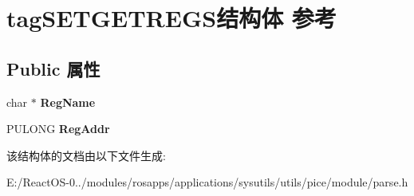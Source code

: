 \hypertarget{structtag_s_e_t_g_e_t_r_e_g_s}{}\section{tag\+S\+E\+T\+G\+E\+T\+R\+E\+G\+S结构体 参考}
\label{structtag_s_e_t_g_e_t_r_e_g_s}
\subsection*{Public 属性}
\begin{DoxyCompactItemize}
\item 
\mbox{\label{structtag_s_e_t_g_e_t_r_e_g_s_a567a9d8d11ca959fbaed0e6d025e4562}} 
char $\ast$ {\bfseries Reg\+Name}
\item 
\mbox{\label{structtag_s_e_t_g_e_t_r_e_g_s_aaad921304827677ca12202f8f93ef863}} 
P\+U\+L\+O\+NG {\bfseries Reg\+Addr}
\end{DoxyCompactItemize}


该结构体的文档由以下文件生成\+:\begin{DoxyCompactItemize}
\item 
E\+:/\+React\+O\+S-\/0../modules/rosapps/applications/sysutils/utils/pice/module/parse.\+h\end{DoxyCompactItemize}
